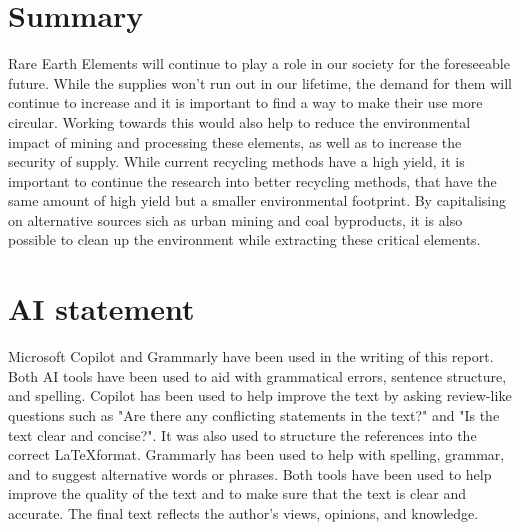 \section{Summary}

Rare Earth Elements will continue to play a role in our society for the foreseeable future. While the supplies won't run out in our lifetime, the demand for them will continue to increase and it is important to find a way to make their use more circular. Working towards this would also help to reduce the environmental impact of mining and processing these elements, as well as to increase the security of supply. While current recycling methods have a high yield, it is important to continue the research into better recycling methods, that have the same amount of high yield but a smaller environmental footprint. By capitalising on alternative sources sich as urban mining and coal byproducts, it is also possible to clean up the environment while extracting these critical elements. 

\section{AI statement}

Microsoft Copilot and Grammarly have been used in the writing of this report. Both AI tools have been used to aid with grammatical errors, sentence structure, and spelling. Copilot has been used to help improve the text by asking review-like questions such as "Are there any conflicting statements in the text?" and "Is the text clear and concise?". It was also used to structure the references into the correct \LaTeX format. Grammarly has been used to help with spelling, grammar, and to suggest alternative words or phrases. Both tools have been used to help improve the quality of the text and to make sure that the text is clear and accurate. The final text reflects the author's views, opinions, and knowledge.

